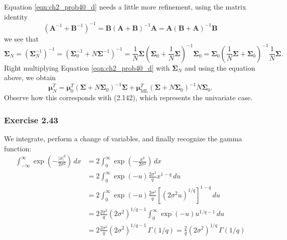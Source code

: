 \documentclass[12pt, a4paper]{article}
\newcommand{\vect}[1]{\bm{#1}}
\newcommand{\abs}[1]{\left\lvert#1\right\rvert}
\begin{document}
Equation \eqref{eqn:ch2_prob40_d} needs a little more refinement, using the matrix identity 
\begin{equation*}
	(\vect{A}^{-1} + \vect{B}^{-1})^{-1} = \vect{B}( \vect{A} + \vect{B})^{-1} \vect{A} = \vect{A}( \vect{B} + \vect{A})^{-1} \vect{B}
\end{equation*}
we see that 
\begin{equation*}
	\vect{\Sigma}_N = \left( \vect{\Sigma}_N^{-1} \right)^{-1}
	= \left( \vect{\Sigma}_0^{-1} + N \vect{\Sigma}^{-1} \right)^{-1}
	= \frac{1}{N} \vect{\Sigma} \left( \vect{\Sigma}_0 + \frac{1}{N} \vect{\Sigma} \right)^{-1} \vect{\Sigma}_0
	= \vect{\Sigma}_0 \left( \frac{1}{N} \vect{\Sigma} + \vect{\Sigma}_0 \right)^{-1} \frac{1}{N} \vect{\Sigma}.
\end{equation*}
Right multiplying Equation \eqref{eqn:ch2_prob40_d} with $\vect{\Sigma}_N$ and using the equation above, we obtain
\begin{equation*}
	\vect{\mu}_N^T = \vect{\mu}_0^T \left( \vect{\Sigma} +N \vect{\Sigma}_0 \right)^{-1} \vect{\Sigma}
	+ \vect{\mu}_{\text{ML}}^T  \left( \vect{\Sigma} +N \vect{\Sigma}_0 \right)^{-1} N \vect{\Sigma}_0.
\end{equation*}
Observe how this corresponds with (2.142), which represents the univariate case.


\subsubsection*{Exercise 2.43}
We integrate, perform a change of variables, and finally recognize the gamma function:
\begin{align*}
	\int_{-\infty}^{\infty}  \exp \left( - \frac{\abs{x}^q}{2 \sigma^2} \right) \, dx &= 
	2 \int_{0}^{\infty}  \exp \left( - \frac{x^q}{2 \sigma^2} \right) \, dx \tag{symmetry} \\
	&= 
	2 \int_{0}^{\infty}  \exp \left( - u \right)
	\frac{2 \sigma^2}{q} x^{1-q} \, du
	 \tag{substitute $u = x^q / 2 \sigma^2$} \\
	 &= 
	 2 \int_{0}^{\infty}  \exp \left( - u \right)
	 \frac{2 \sigma^2}{q} \left[ \left( 2 \sigma^2 u \right)^{1/q} \right]^{1-q} \, du
	 \tag{substitute definition} \\
	 &= 
	 2 
	 \frac{2 \sigma^2}{q} (2 \sigma^2)^{1/q - 1}
	 \int_{0}^{\infty}  \exp \left( - u \right)
	 u^{1/q - 1} \, du
	 \tag{recognize $\Gamma(1/q)$} \\
	 &= 
	 2 
	 \frac{2 \sigma^2}{q} (2 \sigma^2)^{1/q - 1}
	 \, \Gamma(1/q) = \frac{2}{q} (2 \sigma^2)^{1/q} \, \Gamma (1 / q)
\end{align*}
\end{document}
